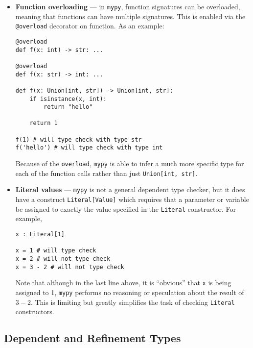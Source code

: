 \documentclass{book}
\begin{document}
\begin{itemize}
    \item \textbf{Function overloading} --- in \texttt{mypy}, function signatures can be overloaded, meaning that functions can have multiple signatures. This is enabled via the \texttt{@overload} decorator on function. As an example:

    \begin{singlespace*}
    \begin{verbatim}
@overload
def f(x: int) -> str: ...

@overload
def f(x: str) -> int: ...

def f(x: Union[int, str]) -> Union[int, str]:
    if isinstance(x, int):
        return "hello"

    return 1

f(1) # will type check with type str
f('hello') # will type check with type int\end{verbatim}
    \end{singlespace*}
    Because of the \texttt{overload}, \texttt{mypy} is able to infer a much more specific type for each of the function calls rather than just \texttt{Union[int, str]}.

    \item \textbf{Literal values} --- \texttt{mypy} is not a general dependent type checker, but it does have a construct \texttt{Literal[Value]} which requires that a parameter or variable be assigned to exactly the value specified in the \texttt{Literal} constructor. For example,

    \begin{singlespace*}
        \begin{verbatim}
x : Literal[1]

x = 1 # will type check
x = 2 # will not type check
x = 3 - 2 # will not type check\end{verbatim}
    \end{singlespace*}
    Note that although in the last line above, it is ``obvious'' that \texttt{x} is being assigned to 1, \texttt{mypy} performs no reasoning or speculation about the result of $3 - 2$. This is limiting but greatly simplifies the task of checking \texttt{Literal} constructors.

\end{itemize}

\subsection{Dependent and Refinement Types}
\end{document}
